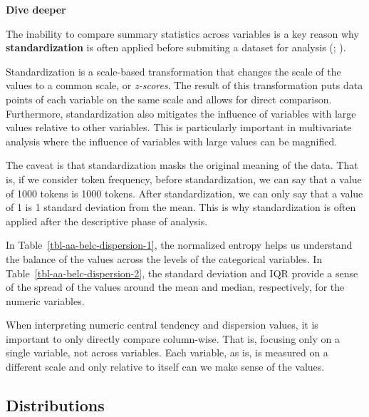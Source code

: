 \documentclass[
  letterpaper,
]{latex/krantz}
\theoremstyle{definition}
\theoremstyle{remark}
\begin{document}
\begin{tcolorbox}[enhanced jigsaw, colframe=quarto-callout-color-frame, breakable, bottomrule=.15mm, arc=.35mm, left=2mm, opacityback=0, rightrule=.15mm, colback=white, toprule=.15mm, leftrule=.75mm]

\textbf{ Dive deeper}

The inability to compare summary statistics across variables is a key
reason why \textbf{standardization} is often applied before submiting a
dataset for analysis (;
).

Standardization is a scale-based transformation that changes the scale
of the values to a common scale, or \emph{z-scores}. The result of this
transformation puts data points of each variable on the same scale and
allows for direct comparison. Furthermore, standardization also
mitigates the influence of variables with large values relative to other
variables. This is particularly important in multivariate analysis where
the influence of variables with large values can be magnified.

The caveat is that standardization masks the original meaning of the
data. That is, if we consider token frequency, before standardization,
we can say that a value of 1000 tokens is 1000 tokens. After
standardization, we can only say that a value of 1 is 1 standard
deviation from the mean. This is why standardization is often applied
after the descriptive phase of analysis.

\end{tcolorbox}

In Table~\ref{tbl-aa-belc-dispersion-1}, the normalized entropy helps us
understand the balance of the values across the levels of the
categorical variables. In Table~\ref{tbl-aa-belc-dispersion-2}, the
standard deviation and IQR provide a sense of the spread of the values
around the mean and median, respectively, for the numeric variables.

When interpreting numeric central tendency and dispersion values, it is
important to only directly compare column-wise. That is, focusing only
on a single variable, not across variables. Each variable, as is, is
measured on a different scale and only relative to itself can we make
sense of the values.

\subsection{Distributions}\label{sec-aa-distributions}
\end{document}
